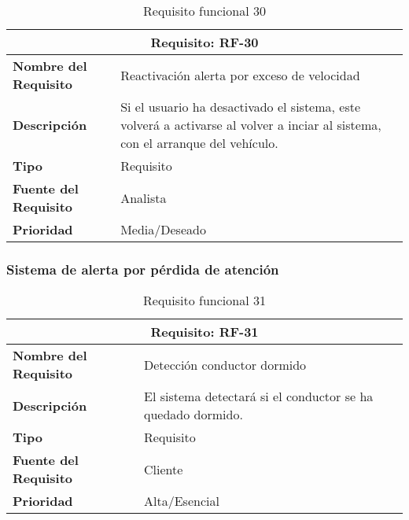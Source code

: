 \begin{table}[H]
\begin{center}
\begin{tabular}{p{} p{7cm}}
\multicolumn{2}{c}{\textbf{Requisito: RF-30} } \\
\hline \hline
\textbf{Nombre del Requisito} & Reactivación alerta por exceso de  velocidad \\
\hline
\textbf{Descripción} & Si el usuario ha desactivado el sistema, este volverá a activarse al volver a inciar al sistema, con el arranque del vehículo. \\
\hline
\textbf{Tipo} & Requisito  \\
\hline
\textbf{Fuente del Requisito} & Analista  \\
\hline
\textbf{Prioridad} & Media/Deseado  \\ \hline
\end{tabular}
\caption{Requisito funcional 30}
\label{tab:RF-30}
\end{center}
\end{table}


\subsubsection{Sistema de alerta por pérdida de atención}

\begin{table}[H]
\begin{center}
\begin{tabular}{p{} p{7cm}}
\multicolumn{2}{c}{\textbf{Requisito: RF-31} } \\
\hline \hline
\textbf{Nombre del Requisito} & Detección conductor dormido\\
\hline
\textbf{Descripción} & El sistema detectará si el conductor se ha quedado dormido.\\
\hline
\textbf{Tipo} & Requisito  \\
\hline
\textbf{Fuente del Requisito} & Cliente  \\
\hline
\textbf{Prioridad} & Alta/Esencial  \\ \hline
\end{tabular}
\caption{Requisito funcional 31}
\label{tab:RF-31}
\end{center}
\end{table}



